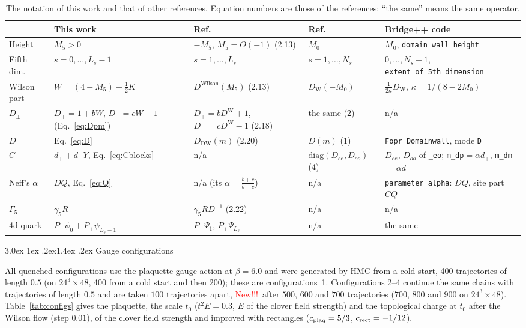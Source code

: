 \documentclass[11pt,a4paper]{article}
\makeatletter
\newif\ifshownew \shownewtrue
\DeclareRobustCommand\New{\ifshownew\textcolor{red}{New!!!}\ \else\ignorespaces\fi}
\renewcommand\section{\@startsection{section}{1}{\z@}%
  {3.0ex \@plus 1ex \@minus .2ex}{1.4ex \@plus .2ex}%
  {\centering\normalfont\normalsize\bfseries}}
\newcommand\FloatBarrier{\par\begingroup\let\@elt\relax
  \edef\@tempa{\@botlist\@deferlist\@dbldeferlist}%
  \ifx\@tempa\@empty\else\clearpage\fi\endgroup}
\let\origsection\section
\renewcommand\section{\FloatBarrier\origsection}
\numberwithin{equation}{section}
\newcommand{\Pp}{P_{+}}
\newcommand{\Pm}{P_{-}}
\newif\ifresults
\makeatother
\begin{document}
\begin{table}[t]
\centering
\caption{The notation of this work and that of other references.
Equation numbers are those of the references; ``the same'' means the same operator.}
\label{tab:notation}
\footnotesize
\setlength{\tabcolsep}{3pt}
\renewcommand{\arraystretch}{1.15}
\begin{tabular}{@{}>{\raggedright}p{1.7cm}>{\raggedright}p{3.0cm}>{\raggedright}p{3.1cm}>{\raggedright}p{2.9cm}>{\raggedright\arraybackslash}p{3.6cm}@{}}
\toprule
 & This work & Ref.~\cite{BNO} & Ref.~\cite{KCM2024} & Bridge++ code\\
\midrule
Height & $M_5>0$ & $-M_5$, $M_5=O(-1)$ (2.13) & $M_0$ & $M_0$, \texttt{domain\_wall\_height}\\
Fifth dim. & $s=0,\dots,L_s-1$ & $s=1,\dots,L_s$ & $s=1,\dots,N_s$ & $0,\dots,N_s-1$, \texttt{extent\_of\_5th\_\allowbreak dimension}\\
Wilson part & $W=(4-M_5)-\tfrac12K$ & $D^{\mathrm{Wilson}}(M_5)$ (2.13) & $D_{\mathrm W}(-M_0)$ & $\frac1{2\kappa}D_{\mathrm W}$, $\kappa=1/(8-2M_0)$\\
$D_\pm$ & $D_+=1+bW$, $D_-=cW-1$ (Eq.~\eqref{eq:Dpm}) & $D_+=bD^{\mathrm{W}}+1$, $D_-=cD^{\mathrm{W}}-1$ (2.18) & the same (2) & n/a\\
$D$ & Eq.~\eqref{eq:D} & $D_{\mathrm{DW}}(m)$ (2.20) & $D(m)$ (1) & \texttt{Fopr\_Domainwall}, mode \texttt{D}\\
$C$ & $d_++d_-Y$, Eq.~\eqref{eq:Cblocks} & n/a & $\mathrm{diag}(D_{ee},D_{oo})$ (4) & $D_{ee}$, $D_{oo}$ of \texttt{\_eo}; \texttt{m\_dp}${}=\alpha d_+$, \texttt{m\_dm}${}=\alpha d_-$\\
Neff's $\alpha$ & $DQ$, Eq.~\eqref{eq:Q} & n/a (its $\alpha=\frac{b+c}{b-c}$) & n/a & \texttt{parameter\_alpha}: $DQ$, site part $CQ$\\
$\Gamma_5$ & $\gamma_5R$ & $\gamma_5RD_-^{-1}$ (2.22) & n/a & n/a\\
4d quark & $\Pm\psi_0+\Pp\psi_{L_s-1}$ & $P_-\Psi_1$, $P_+\Psi_{L_s}$ & n/a & the same\\
\bottomrule
\end{tabular}
\end{table}

\ifresults
\section{Gauge configurations}
\label{sec:configs}

All quenched configurations use the plaquette gauge action at $\beta=6.0$ and were generated by
HMC from a cold start, 400 trajectories of length $0.5$ (on $24^3\times48$, 400
from a cold start and then 200); these are configurations~1. Configurations 2--4 continue the same
chains with trajectories of length $0.5$ and are taken $100$ trajectories apart, \New after $500$, $600$
and $700$ trajectories ($700$, $800$ and $900$ on $24^3\times48$). Table~\ref{tab:configs}
gives the plaquette, the scale $t_0$ ($t^2E=0.3$, $E$ of the clover field strength) and the
topological charge at $t_0$ after the Wilson flow (step $0.01$), of the clover field strength and
improved with rectangles ($c_{\rm plaq}=5/3$, $c_{\rm rect}=-1/12$).
\end{document}
